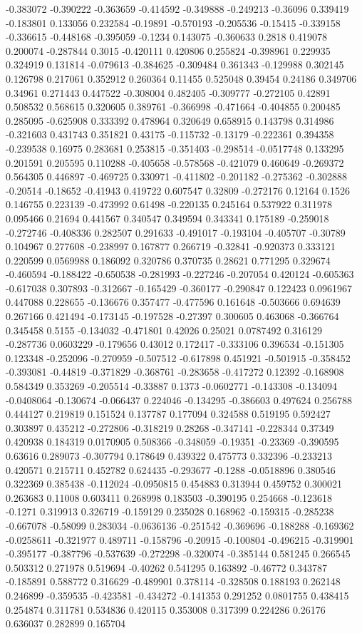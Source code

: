 -0.383072 -0.390222 -0.363659 -0.414592 -0.349888 -0.249213 -0.36096 0.339419 -0.183801 0.133056 0.232584 -0.19891 -0.570193 -0.205536 -0.15415 -0.339158 -0.336615 -0.448168 -0.395059 -0.1234 0.143075 -0.360633 0.2818 0.419078 0.200074 -0.287844 0.3015 -0.420111 0.420806 0.255824 -0.398961 0.229935 0.324919 0.131814 -0.079613 -0.384625 -0.309484 0.361343 -0.129988 0.302145 0.126798 0.217061 0.352912 0.260364 0.11455 0.525048 0.39454 0.24186 0.349706 0.34961 0.271443 0.447522 -0.308004 0.482405 -0.309777 -0.272105 0.42891 0.508532 0.568615 0.320605 0.389761 -0.366998 -0.471664 -0.404855 0.200485 0.285095 -0.625908 0.333392 0.478964 0.320649 0.658915 0.143798 0.314986 -0.321603 0.431743 0.351821 0.43175 -0.115732 -0.13179 -0.222361 0.394358 -0.239538 0.16975 0.283681 0.253815 -0.351403 -0.298514 -0.0517748 0.133295 0.201591 0.205595 0.110288 -0.405658 -0.578568 -0.421079 0.460649 -0.269372 0.564305 0.446897 -0.469725 0.330971 -0.411802 -0.201182 -0.275362 -0.302888 -0.20514 -0.18652 -0.41943 0.419722 0.607547 0.32809 -0.272176 0.12164 0.1526 0.146755 0.223139 -0.473992 0.61498 -0.220135 0.245164 0.537922 0.311978 0.095466 0.21694 0.441567 0.340547 0.349594 0.343341 0.175189 -0.259018 -0.272746 -0.408336 0.282507 0.291633 -0.491017 -0.193104 -0.405707 -0.30789 0.104967 0.277608 -0.238997 0.167877 0.266719 -0.32841 -0.920373 0.333121 0.220599 0.0569988 0.186092 0.320786 0.370735 0.28621 0.771295 0.329674 -0.460594 -0.188422 -0.650538 -0.281993 -0.227246 -0.207054 0.420124 -0.605363 -0.617038 0.307893 -0.312667 -0.165429 -0.360177 -0.290847 0.122423 0.0961967 0.447088 0.228655 -0.136676 0.357477 -0.477596 0.161648 -0.503666 0.694639 0.267166 0.421494 -0.173145 -0.197528 -0.27397 0.300605 0.463068 -0.366764 0.345458 0.5155 -0.134032 -0.471801 0.42026 0.25021 0.0787492 0.316129 -0.287736 0.0603229 -0.179656 0.43012 0.172417 -0.333106 0.396534 -0.151305 0.123348 -0.252096 -0.270959 -0.507512 -0.617898 0.451921 -0.501915 -0.358452 -0.393081 -0.44819 -0.371829 -0.368761 -0.283658 -0.417272 0.12392 -0.168908 0.584349 0.353269 -0.205514 -0.33887 0.1373 -0.0602771 -0.143308 -0.134094 -0.0408064 -0.130674 -0.066437 0.224046 -0.134295 -0.386603 0.497624 0.256788 0.444127 0.219819 0.151524 0.137787 0.177094 0.324588 0.519195 0.592427 0.303897 0.435212 -0.272806 -0.318219 0.28268 -0.347141 -0.228344 0.37349 0.420938 0.184319 0.0170905 0.508366 -0.348059 -0.19351 -0.23369 -0.390595 0.63616 0.289073 -0.307794 0.178649 0.439322 0.475773 0.332396 -0.233213 0.420571 0.215711 0.452782 0.624435 -0.293677 -0.1288 -0.0518896 0.380546 0.322369 0.385438 -0.112024 -0.0950815 0.454883 0.313944 0.459752 0.300021 0.263683 0.11008 0.603411 0.268998 0.183503 -0.390195 0.254668 -0.123618 -0.1271 0.319913 0.326719 -0.159129 0.235028 0.168962 -0.159315 -0.285238 -0.667078 -0.58099 0.283034 -0.0636136 -0.251542 -0.369696 -0.188288 -0.169362 -0.0258611 -0.321977 0.489711 -0.158796 -0.20915 -0.100804 -0.496215 -0.319901 -0.395177 -0.387796 -0.537639 -0.272298 -0.320074 -0.385144 0.581245 0.266545 0.503312 0.271978 0.519694 -0.40262 0.541295 0.163892 -0.46772 0.343787 -0.185891 0.588772 0.316629 -0.489901 0.378114 -0.328508 0.188193 0.262148 0.246899 -0.359535 -0.423581 -0.434272 -0.141353 0.291252 0.0801755 0.438415 0.254874 0.311781 0.534836 0.420115 0.353008 0.317399 0.224286 0.26176 0.636037 0.282899 0.165704 
